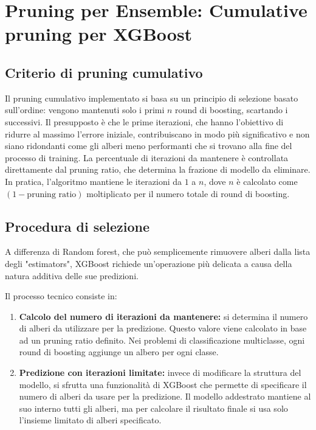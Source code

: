 \documentclass[a4paper,12pt]{report}
\begin{document}
	\section{Pruning per Ensemble: Cumulative pruning per XGBoost}
	
	\subsection{Criterio di pruning cumulativo}
	Il pruning cumulativo implementato si basa su un principio di selezione basato sull'ordine: vengono mantenuti solo i primi $n$ round di boosting, scartando i successivi. Il presupposto è che le prime iterazioni, che hanno l'obiettivo di ridurre al massimo l'errore iniziale, contribuiscano in modo più significativo e non siano ridondanti come gli alberi meno performanti che si trovano alla fine del processo di training. La percentuale di iterazioni da mantenere è controllata direttamente dal pruning ratio, che determina la frazione di modello da eliminare. In pratica, l'algoritmo mantiene le iterazioni da $1$ a $n$, dove $n$ è calcolato come $(1 - \text{pruning ratio})$ moltiplicato per il numero totale di round di boosting.
	
	\subsection{Procedura di selezione}
	A differenza di Random forest, che può semplicemente rimuovere alberi dalla lista degli "estimators", XGBoost richiede un'operazione più delicata a causa della natura additiva delle sue predizioni.
	
	Il processo tecnico consiste in:
	\begin{enumerate}
		\item \textbf{Calcolo del numero di iterazioni da mantenere:} si determina il numero di alberi da utilizzare per la predizione. Questo valore viene calcolato in base ad un pruning ratio definito. Nei problemi di classificazione multiclasse, ogni round di boosting aggiunge un albero per ogni classe.
		\item \textbf{Predizione con iterazioni limitate:} invece di modificare la struttura del modello, si sfrutta una funzionalità di XGBoost che permette di specificare il numero di alberi da usare per la predizione. Il modello addestrato mantiene al suo interno tutti gli alberi, ma per calcolare il risultato finale si usa solo l'insieme limitato di alberi specificato.
	\end{enumerate}
	
\end{document}

